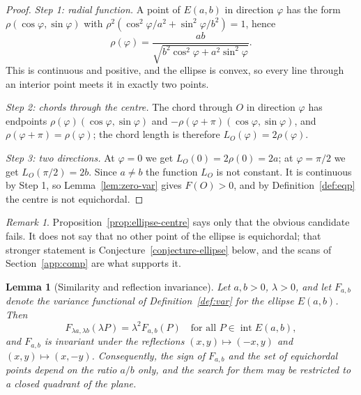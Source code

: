 \documentclass[11pt]{article}
\newtheorem{lemma}[theorem]{Lemma}
\theoremstyle{definition}
\theoremstyle{remark}
\newtheorem{remark}[theorem]{Remark}
\begin{document}
\begin{proof}
\emph{Step 1: radial function.} A point of $E(a,b)$ in direction $\varphi$ has the form $\rho(\cos\varphi,\sin\varphi)$
with $\rho^2(\cos^2\varphi/a^2+\sin^2\varphi/b^2)=1$, hence
\[
\rho(\varphi)=\frac{ab}{\sqrt{b^2\cos^2\varphi+a^2\sin^2\varphi}} .
\]
This is continuous and positive, and the ellipse is convex, so every line through an interior point meets it in
exactly two points.

\emph{Step 2: chords through the centre.} The chord through $O$ in direction $\varphi$ has endpoints
$\rho(\varphi)(\cos\varphi,\sin\varphi)$ and $-\rho(\varphi+\pi)(\cos\varphi,\sin\varphi)$, and
$\rho(\varphi+\pi)=\rho(\varphi)$; the chord length is therefore $L_O(\varphi)=2\rho(\varphi)$.

\emph{Step 3: two directions.} At $\varphi=0$ we get $L_O(0)=2\rho(0)=2a$; at $\varphi=\pi/2$ we get
$L_O(\pi/2)=2b$. Since $a\neq b$ the function $L_O$ is not constant. It is continuous by Step 1, so
Lemma~\ref{lem:zero-var} gives $F(O)>0$, and by Definition~\ref{def:eqp} the centre is not equichordal.
\end{proof}

\begin{remark}
Proposition~\ref{prop:ellipse-centre} says only that the obvious candidate fails. It does not say that no other
point of the ellipse is equichordal; that stronger statement is Conjecture~\ref{conjecture-ellipse} below, and the
scans of Section~\ref{app:comp} are what supports it.
\end{remark}

\begin{lemma}[Similarity and reflection invariance]\label{lem:similarity}
Let $a,b>0$, $\lambda>0$, and let $F_{a,b}$ denote the variance functional of Definition~\ref{def:var} for the
ellipse $E(a,b)$. Then
\[
F_{\lambda a,\lambda b}(\lambda P)=\lambda^2 F_{a,b}(P)\quad\text{for all }P\in\operatorname{int}E(a,b),
\]
and $F_{a,b}$ is invariant under the reflections $(x,y)\mapsto(-x,y)$ and $(x,y)\mapsto(x,-y)$. Consequently, the
sign of $F_{a,b}$ and the set of equichordal points depend on the ratio $a/b$ only, and the search for them may be
restricted to a closed quadrant of the plane.
\end{lemma}
\end{document}
